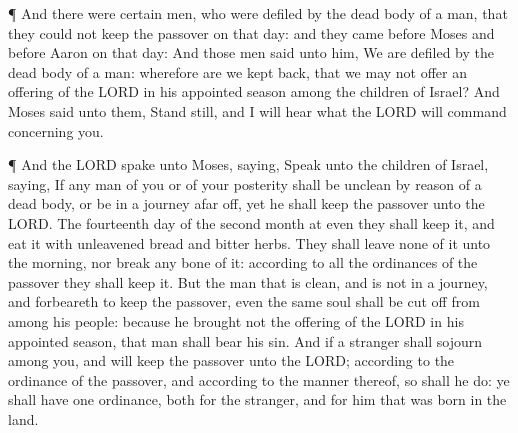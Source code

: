  ¶ And there were certain men, who were defiled by the dead
body of a man, that they could not keep the passover on that day: and
they came before Moses and before Aaron on that day:  And
those men said unto him, We are defiled by the dead body of a man:
wherefore are we kept back, that we may not offer an offering of the
LORD in his appointed season among the children of Israel? 
And Moses said unto them, Stand still, and I will hear what the LORD
will command concerning you.

 ¶ And the LORD spake unto Moses, saying, 
Speak unto the children of Israel, saying, If any man of you or of your
posterity shall be unclean by reason of a dead body, or be in a journey
afar off, yet he shall keep the passover unto the LORD. 
The fourteenth day of the second month at even they shall keep it, and
eat it with unleavened bread and bitter herbs.  They shall
leave none of it unto the morning, nor break any bone of it: according
to all the ordinances of the passover they shall keep it. 
But the man that is clean, and is not in a journey, and forbeareth to
keep the passover, even the same soul shall be cut off from among his
people: because he brought not the offering of the LORD in his appointed
season, that man shall bear his sin.  And if a stranger
shall sojourn among you, and will keep the passover unto the LORD;
according to the ordinance of the passover, and according to the manner
thereof, so shall he do: ye shall have one ordinance, both for the
stranger, and for him that was born in the land.

